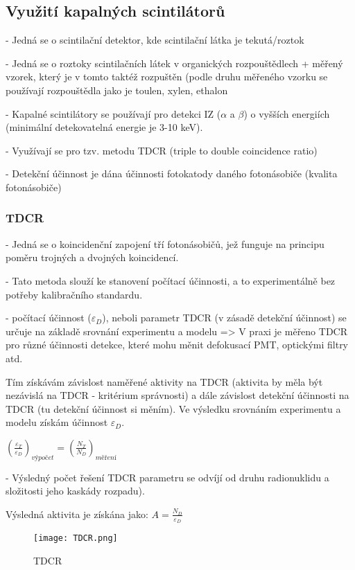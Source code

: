 \subsection{Využití kapalných scintilátorů}

- Jedná se o scintilační detektor, kde scintilační látka je tekutá/roztok

- Jedná se o roztoky scintilačních látek v organických rozpouštědlech + měřený vzorek, který je v tomto taktéž rozpuštěn (podle druhu měřeného vzorku se používají rozpouštědla jako je toulen, xylen, ethalon

- Kapalné scintilátory se používají pro detekci IZ ($\alpha$ a $\beta$) o vyšších energiích (minimální detekovatelná energie je 3-10 keV).

- Využívají se pro tzv. metodu TDCR (triple to double coincidence ratio)

- Detekční účinnost je dána účinnosti fotokatody daného fotonásobiče (kvalita fotonásobiče)

\subsubsection{TDCR}

- Jedná se o koincidenční zapojení tří fotonásobičů, jež funguje na principu poměru trojných a dvojných koincidencí.

- Tato metoda slouží ke stanovení počítací účinnosti, a to experimentálně bez potřeby kalibračního standardu.

- počítací účinnost ($\varepsilon_D$), neboli parametr TDCR (v zásadě detekční účinnost) se určuje na základě srovnání experimentu a modelu => V praxi je měřeno TDCR pro různé účinnosti detekce, které mohu měnit defokusací PMT, optickými filtry atd. 

Tím získávám závislost naměřené aktivity na TDCR (aktivita by měla být nezávislá na TDCR - kritérium správnosti) a dále závislost detekční účinnosti na TDCR (tu detekční účinnost si měním). Ve výsledku srovnáním experimentu a modelu získám účinnost $\varepsilon_D$.

$\left(\frac{\varepsilon_T}{\varepsilon_D}\right)_{výpočet} = \left(\frac{N_T}{N_D}\right)_{měření}$

- Výsledný počet řešení TDCR parametru se odvíjí od druhu radionuklidu a složitosti jeho kaskády rozpadu).

Výsledná aktivita je získána jako: $A = \frac{N_D}{\varepsilon_D}$

\begin{figure}[ht!]
    \centering
    \texttt{[image: TDCR.png]}
    \caption{TDCR}
\end{figure}

